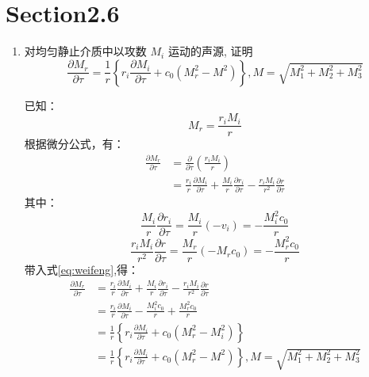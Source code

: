 \section*{Section2.6}

\begin{enumerate}
    \item 对均匀静止介质中以攻数  \(M_{i} \) 运动的声源, 证明 
        \[ \frac{\partial M_{r}}{\partial \tau}
        = \frac{1}{r}\left\{r_{i} \frac{\partial M_{i}}{\partial \tau}+c_{0}\left(M_{r}^{2}-M^{2}\right)\right\}
        , M=\sqrt{M_{1}^{2}+M_{2}^{2}+M_{3}^{2}} \]

        已知：
        \begin{equation}
            M_{r}=\frac{r_{i} M_{i}}{r}
        \end{equation}
        根据微分公式，有：
        \begin{equation}
            \label{eq:weifeng}
            \begin{aligned}
                \frac{\partial M_{r}}{\partial \tau}
                &= \frac{\partial}{\partial \tau} (\frac{r_{i} M_{i}}{r}) \\
                &= \frac{r_{i}}{r} \frac{\partial M_{i}}{\partial \tau}
                + \frac{M_{i}}{r} \frac{\partial r_{i}}{\partial \tau}
                - \frac{r_{i} M_{i}}{r^{2}} \frac{\partial r}{\partial \tau}
            \end{aligned}
        \end{equation}
        其中：
        \begin{equation}
            \frac{M_{i}}{r} \frac{\partial r_{i}}{\partial \tau}
            = \frac{M_{i}}{r} (-v_{i})
            = -\frac{M_{i}^{2} c_{0}}{r}
        \end{equation}
        \begin{equation}
            \frac{r_{i} M_{i}}{r^{2}} \frac{\partial r}{\partial \tau}
            = \frac{M_{r}}{r} ( -M_{r} c_{0} )
            = -\frac{M_{r}^{2} c_{0}}{r}
        \end{equation}
        带入式\eqref{eq:weifeng},得：
        \begin{equation}
            \begin{aligned}
                \frac{\partial M_{r}}{\partial \tau}
                &= \frac{r_{i}}{r} \frac{\partial M_{i}}{\partial \tau}
                + \frac{M_{i}}{r} \frac{\partial r_{i}}{\partial \tau}
                - \frac{r_{i} M_{i}}{r^{2}} \frac{\partial r}{\partial \tau} \\
                &= \frac{r_{i}}{r} \frac{\partial M_{i}}{\partial \tau}
                -\frac{M_{i}^{2} c_{0}}{r}
                +\frac{M_{r}^{2} c_{0}}{r} \\
                &= \frac{1}{r}\left\{r_{i} \frac{\partial M_{i}}{\partial \tau}
                + c_{0}\left(M_{r}^{2}-M_{i}^{2}\right)\right\} \\
                &= \frac{1}{r}\left\{r_{i} \frac{\partial M_{i}}{\partial \tau}
                + c_{0}\left(M_{r}^{2}-M^{2}\right)\right\}
                , M=\sqrt{M_{1}^{2}+M_{2}^{2}+M_{3}^{2}}
            \end{aligned}
        \end{equation}


\end{enumerate}
